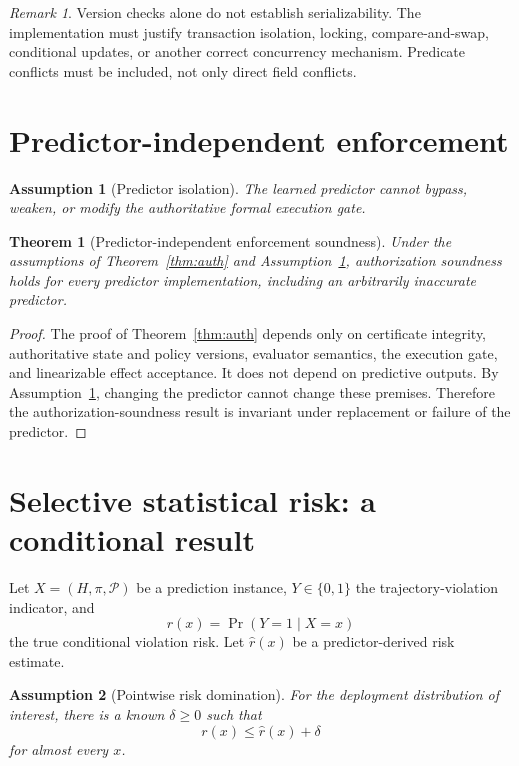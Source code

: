 \documentclass[11pt,a4paper]{article}
\newtheorem{assumption}{Assumption}[section]
\newtheorem{theorem}{Theorem}[section]
\theoremstyle{remark}
\newtheorem{remark}{Remark}[section]
\begin{document}
\begin{remark}
Version checks alone do not establish serializability. The implementation must justify transaction isolation, locking, compare-and-swap, conditional updates, or another correct concurrency mechanism. Predicate conflicts must be included, not only direct field conflicts.
\end{remark}

\section{Predictor-independent enforcement}

\begin{assumption}[Predictor isolation]\label{a:iso}
The learned predictor cannot bypass, weaken, or modify the authoritative formal execution gate.
\end{assumption}

\begin{theorem}[Predictor-independent enforcement soundness]\label{thm:independent}
Under the assumptions of Theorem~\ref{thm:auth} and Assumption~\ref{a:iso}, authorization soundness holds for every predictor implementation, including an arbitrarily inaccurate predictor.
\end{theorem}

\begin{proof}
The proof of Theorem~\ref{thm:auth} depends only on certificate integrity, authoritative state and policy versions, evaluator semantics, the execution gate, and linearizable effect acceptance. It does not depend on predictive outputs. By Assumption~\ref{a:iso}, changing the predictor cannot change these premises. Therefore the authorization-soundness result is invariant under replacement or failure of the predictor.
\end{proof}

\section{Selective statistical risk: a conditional result}

Let $X=(H,\pi,\mathcal P)$ be a prediction instance, $Y\in\{0,1\}$ the trajectory-violation indicator, and
\[
r(x)=\Pr(Y=1\mid X=x)
\]
the true conditional violation risk. Let $\widehat r(x)$ be a predictor-derived risk estimate.

\begin{assumption}[Pointwise risk domination]\label{a:risk}
For the deployment distribution of interest, there is a known $\delta\geq0$ such that
\[
r(x)\leq\widehat r(x)+\delta
\]
for almost every $x$.
\end{assumption}
\end{document}
